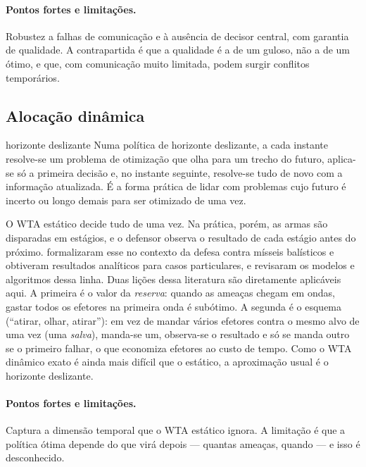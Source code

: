 \paragraph{Pontos fortes e limitações.} Robustez a falhas de comunicação e à ausência de decisor central, com garantia de
qualidade. A contrapartida é que a qualidade é a de um guloso, não a de um ótimo, e que, com comunicação muito limitada,
podem surgir conflitos temporários.

\subsection{Alocação dinâmica}

\begin{conceitobox}{horizonte deslizante}
Numa política de horizonte deslizante, a cada instante resolve-se um problema de otimização que olha para um trecho do
futuro, aplica-se só a primeira decisão e, no instante seguinte, resolve-se tudo de novo com a informação atualizada. É a
forma prática de lidar com problemas cujo futuro é incerto ou longo demais para ser otimizado de uma vez.
\end{conceitobox}

O WTA estático decide tudo de uma vez. Na prática, porém, as armas são disparadas em estágios, e o defensor observa o
resultado de cada estágio antes do próximo. \citet{hosein1990} formalizaram esse  no contexto da
defesa contra mísseis balísticos e obtiveram resultados analíticos para casos particulares, e \citet{cai2006} revisaram os
modelos e algoritmos dessa linha. Duas lições dessa literatura são diretamente aplicáveis aqui. A primeira é o valor da
\emph{reserva}: quando as ameaças chegam em ondas, gastar todos os efetores na primeira onda é subótimo. A segunda é o
esquema  (``atirar, olhar, atirar''): em vez de mandar vários efetores contra o mesmo
alvo de uma vez (uma \emph{salva}), manda-se um, observa-se o resultado e só se manda outro se o primeiro falhar, o que
economiza efetores ao custo de tempo. Como o WTA dinâmico exato é ainda mais difícil que o estático, a aproximação usual é o
horizonte deslizante.

\paragraph{Pontos fortes e limitações.} Captura a dimensão temporal que o WTA estático ignora. A limitação é que a política
ótima depende do que virá depois --- quantas ameaças, quando --- e isso é desconhecido.

